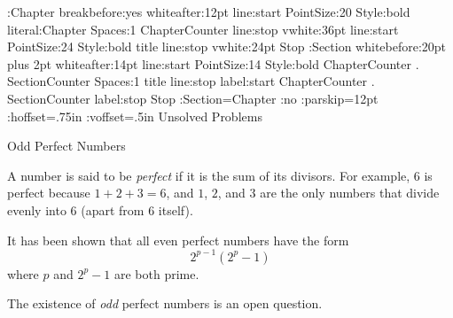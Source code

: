 \DefineHeading:Chapter
   breakbefore:yes whiteafter:12pt
   line:start PointSize:20 Style:bold
      literal:Chapter Spaces:1  ChapterCounter
      line:stop
   vwhite:36pt
   line:start PointSize:24 Style:bold title
      line:stop
   vwhite:24pt
   Stop
\DefineHeading:Section
   whitebefore:{20pt plus 2pt} whiteafter:14pt
   line:start PointSize:14 Style:bold
      ChapterCounter . SectionCounter
      Spaces:1 title line:stop
   label:start ChapterCounter . SectionCounter
      label:stop
   Stop
\GoverningCounter:Section=Chapter
\AlwaysIndent:no
\Distance:parskip=12pt
\Distance:hoffset=.75in
\Distance:voffset=.5in
\Start
\Chapter Unsolved Problems

\Section Odd Perfect Numbers

A number is said to be {\it perfect\/} if it
is the sum of its divisors.  For example, $6$ is
perfect because $1+2+3 = 6$, and $1$, $2$, and $3$
are the only numbers that divide evenly into $6$ 
(apart from $6$ itself).

It has been shown that all even perfect numbers
have the form $$2^{p-1}(2^{p}-1)$$ where $p$
and $2^{p}-1$ are both prime.

The existence of {\it odd\/} perfect numbers is 
an open question.
\Stop
